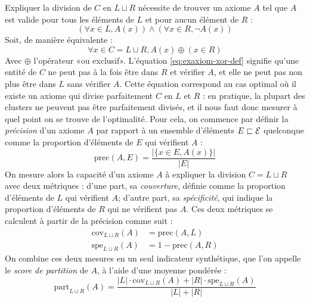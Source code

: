 Expliquer la division de $C$ en $L \sqcup R$ nécessite de trouver un axiome $A$ tel que $A$ est valide pour tous les éléments de $L$ et pour aucun élément de $R$ :
\begin{equation}
    \left(\forall x \in L, A(x)  \right) \land \left(\forall x \in R, \neg A(x) \right)
\end{equation}
Soit, de manière équivalente :
\begin{equation}
    \forall x \in C = L \sqcup R, A(x) \oplus (x \in R)
    \label{eq:exaxiom-xor-def}
\end{equation}
Avec $\oplus$ l'opérateur «ou exclusif». L'équation \ref{eq:exaxiom-xor-def} signifie qu'une entité de $C$ ne peut pas à la fois être dans $R$ et vérifier $A$, et elle ne peut pas non plus être dans $L$ sans vérifier $A$. Cette équation correspond au cas optimal où il existe un axiome qui divise parfaitement $C$ en $L$ et $R$ : en pratique, la plupart des clusters ne peuvent pas être parfaitement divisés, et il nous faut donc mesurer à quel point on se trouve de l'optimalité. Pour cela, on commence par définir la \textit{précision} d'un axiome $A$ par rapport à un ensemble d'éléments $E \sqsubset \mathcal{E}$ quelconque comme la proportion d'éléments de $E$ qui vérifient $A$ :
\begin{equation}
    \text{prec}(A, E) = \frac{|\{ x \in E, A(x)\}|}{| E |}
\end{equation}
On mesure alors la capacité d'un axiome $A$ à expliquer la division $C = L \sqcup R$ avec deux métriques : d'une part, sa \textit{couverture}, définie comme la proportion d'éléments de $L$ qui vérifient $A$; d'autre part, sa \textit{spécificité}, qui indique la proportion d'éléments de $R$ qui ne vérifient pas $A$. Ces deux métriques se calculent à partir de la précision comme suit :
\begin{align}
    \text{cov}_{L \sqcup R}(A) &= \text{prec}(A, L) \\
    \text{spe}_{L \sqcup R}(A) &= 1 - \text{prec}(A, R)
\end{align}
On combine ces deux mesures en un seul indicateur synthétique, que l'on appelle le \textit{score de partition} de $A$, à l'aide d'une moyenne pondérée :
\begin{equation}
    \text{part}_{L \sqcup R}(A) = \frac{|L| \cdot \text{cov}_{L \sqcup R}(A) + |R| \cdot \text{spe}_{L \sqcup R}(A)}{|L| + |R|}
\end{equation}

